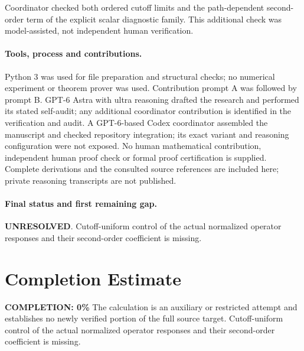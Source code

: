 \documentclass[11pt]{article}
\begin{document}
Coordinator checked both ordered cutoff limits and the path-dependent second-order term of the explicit scalar diagnostic family. This additional check was model-assisted, not independent human verification.

\paragraph{Tools, process and contributions.}
Python 3 was used for file preparation and structural checks; no numerical experiment or theorem prover was used. Contribution prompt A was followed by prompt B. GPT-6 Astra with ultra reasoning drafted the research and performed its stated self-audit; any additional coordinator contribution is identified in the verification and audit. A GPT-6-based Codex coordinator assembled the manuscript and checked repository integration; its exact variant and reasoning configuration were not exposed. No human mathematical contribution, independent human proof check or formal proof certification is supplied. Complete derivations and the consulted source references are included here; private reasoning transcripts are not published.

\paragraph{Final status and first remaining gap.}
\textbf{UNRESOLVED}. Cutoff-uniform control of the actual normalized operator responses and their second-order coefficient is missing.

\section{Completion Estimate}
\noindent\textbf{COMPLETION: 0\%}
The calculation is an auxiliary or restricted attempt and establishes no newly verified portion of the full source target. Cutoff-uniform control of the actual normalized operator responses and their second-order coefficient is missing.
\end{document}
